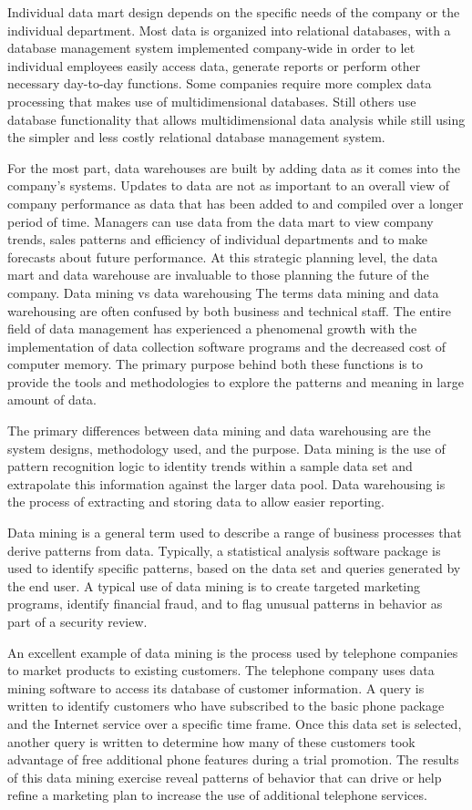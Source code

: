 Individual data mart design depends on the specific needs of the company or the individual department. Most data is organized into relational databases, with a database management system implemented company-wide in order to let individual employees easily access data, generate reports or perform other necessary day-to-day functions. Some companies require more complex data processing that makes use of multidimensional databases. Still others use database functionality that allows multidimensional data analysis while still using the simpler and less costly relational database management system.

For the most part, data warehouses are built by adding data as it comes into the company's systems. Updates to data are not as important to an overall view of company performance as data that has been added to and compiled over a longer period of time. Managers can use data from the data mart to view company trends, sales patterns and efficiency of individual departments and to make forecasts about future performance. At this strategic planning level, the data mart and data warehouse are invaluable to those planning the future of the company.
Data mining vs data warehousing 
The terms data mining and data warehousing are often confused by both business and technical staff. The entire field of data management has experienced a phenomenal growth with the implementation of data collection software programs and the decreased cost of computer memory. The primary purpose behind both these functions is to provide the tools and methodologies to explore the patterns and meaning in large amount of data.

The primary differences between data mining and data warehousing are the system designs, methodology used, and the purpose. Data mining is the use of pattern recognition logic to identity trends within a sample data set and extrapolate this information against the larger data pool. Data warehousing is the process of extracting and storing data to allow easier reporting.

Data mining is a general term used to describe a range of business processes that derive patterns from data. Typically, a statistical analysis software package is used to identify specific patterns, based on the data set and queries generated by the end user. A typical use of data mining is to create targeted marketing programs, identify financial fraud, and to flag unusual patterns in behavior as part of a security review.

An excellent example of data mining is the process used by telephone companies to market products to existing customers. The telephone company uses data mining software to access its database of customer information. A query is written to identify customers who have subscribed to the basic phone package and the Internet service over a specific time frame. Once this data set is selected, another query is written to determine how many of these customers took advantage of free additional phone features during a trial promotion. The results of this data mining exercise reveal patterns of behavior that can drive or help refine a marketing plan to increase the use of additional telephone services.

